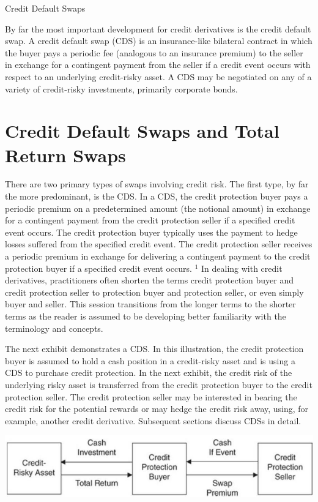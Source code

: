 \documentclass[11pt]{article}
\begin{document}
Credit Default Swaps

By far the most important development for credit derivatives is the credit default swap. A credit default swap (CDS) is an insurance-like bilateral contract in which the buyer pays a periodic fee (analogous to an insurance premium) to the seller in exchange for a contingent payment from the seller if a credit event occurs with respect to an underlying credit-risky asset. A CDS may be negotiated on any of a variety of credit-risky investments, primarily corporate bonds.

\section*{Credit Default Swaps and Total Return Swaps}
There are two primary types of swaps involving credit risk. The first type, by far the more predominant, is the CDS. In a CDS, the credit protection buyer pays a periodic premium on a predetermined amount (the notional amount) in exchange for a contingent payment from the credit protection seller if a specified credit event occurs. The credit protection buyer typically uses the payment to hedge losses suffered from the specified credit event. The credit protection seller receives a periodic premium in exchange for delivering a contingent payment to the credit protection buyer if a specified credit event occurs. ${ }^{1}$ In dealing with credit derivatives, practitioners often shorten the terms credit protection buyer and credit protection seller to protection buyer and protection seller, or even simply buyer and seller. This session transitions from the longer terms to the shorter terms as the reader is assumed to be developing better familiarity with the terminology and concepts.

The next exhibit demonstrates a CDS. In this illustration, the credit protection buyer is assumed to hold a cash position in a credit-risky asset and is using a CDS to purchase credit protection. In the next exhibit, the credit risk of the underlying risky asset is transferred from the credit protection buyer to the credit protection seller. The credit protection seller may be interested in bearing the credit risk for the potential rewards or may hedge the credit risk away, using, for example, another credit derivative. Subsequent sections discuss CDSs in detail.

\begin{center}
\includegraphics[max width=\textwidth]{2024_04_09_87c8b6247d8feabc3893g-2(1)}
\end{center}
\end{document}
